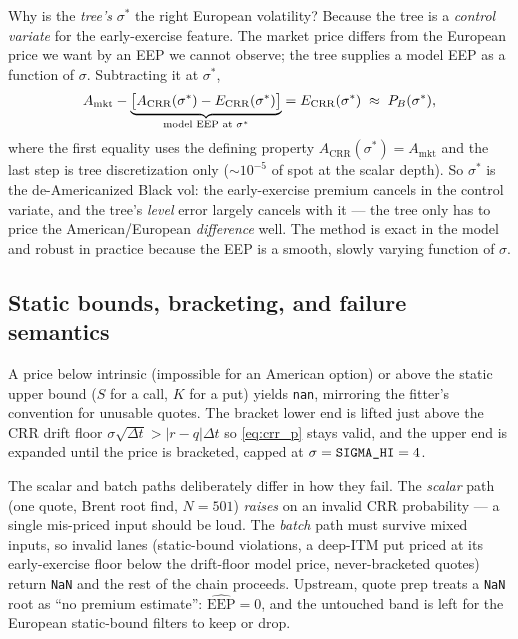 \documentclass[11pt]{article}
\begin{document}
\begin{heuristic}
Why is the \emph{tree's} $\sigma^*$ the right European volatility? Because the
tree is a \emph{control variate} for the early-exercise feature. The market
price differs from the European price we want by an EEP we cannot observe; the
tree supplies a model EEP as a function of $\sigma$. Subtracting it at
$\sigma^*$,
\begin{equation}
A_{\mathrm{mkt}}
-\underbrace{\big[A_{\mathrm{CRR}}(\sigma^*)-E_{\mathrm{CRR}}(\sigma^*)\big]}_{\text{model EEP at }\sigma^*}
= E_{\mathrm{CRR}}(\sigma^*)\;\approx\;P_{B}(\sigma^*),
\label{eq:cv}
\end{equation}
where the first equality uses the defining property
$A_{\mathrm{CRR}}(\sigma^*)=A_{\mathrm{mkt}}$ and the last step is tree
discretization only ($\sim10^{-5}$ of spot at the scalar depth). So $\sigma^*$
is the de-Americanized Black vol: the early-exercise premium cancels in the
control variate, and the tree's \emph{level} error largely cancels with it ---
the tree only has to price the American/European \emph{difference} well. The
method is exact in the model and robust in practice because the EEP is a smooth,
slowly varying function of $\sigma$.
\end{heuristic}

\subsection{Static bounds, bracketing, and failure semantics}
\label{sec:numerics}

A price below intrinsic (impossible for an American option) or above the static
upper bound ($S$ for a call, $K$ for a put) yields \texttt{nan}, mirroring the
fitter's convention for unusable quotes. The bracket lower end is lifted just
above the CRR drift floor $\sigma\sqrt{\Delta t}>|r-q|\Delta t$ so
\cref{eq:crr_p} stays valid, and the upper end is expanded until the price is
bracketed, capped at $\sigma=\text{\texttt{SIGMA\_HI}}=4$.

The scalar and batch paths deliberately differ in how they fail. The
\emph{scalar} path (one quote, Brent root find, $N=501$) \emph{raises} on an
invalid CRR probability --- a single mis-priced input should be loud. The
\emph{batch} path must survive mixed inputs, so invalid lanes (static-bound
violations, a deep-ITM put priced at its early-exercise floor below the
drift-floor model price, never-bracketed quotes) return \texttt{NaN} and the
rest of the chain proceeds. Upstream, quote prep treats a \texttt{NaN} root as
``no premium estimate'': $\widehat{\mathrm{EEP}}=0$, and the untouched band is
left for the European static-bound filters to keep or drop.
\end{document}
